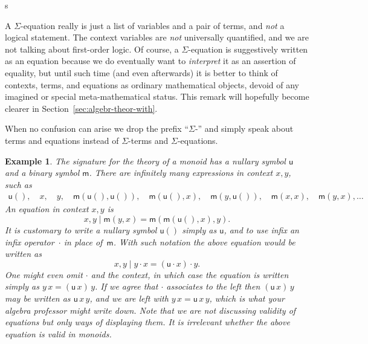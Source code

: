 s\documentclass{amsart}
\newtheorem{example}[definition]{Example}
\begin{document}
A $\Sigma$-equation really is just a list of variables and a pair of terms, and
\emph{not} a logical statement. The context variables are \emph{not} universally
quantified, and we are not talking about first-order logic. Of course, a
$\Sigma$-equation is suggestively written as an equation because we do
eventually want to \emph{interpret} it as an assertion of equality, but until
such time (and even afterwards) it is better to think of contexts, terms, and
equations as ordinary mathematical objects, devoid of any imagined or special
meta-mathematical status. This remark will hopefully become clearer in
Section~\ref{sec:algebr-theor-with}.

When no confusion can arise we drop the prefix ``$\Sigma$-'' and simply speak about
terms and equations instead of $\Sigma$-terms and $\Sigma$-equations.


\begin{example}
  \label{ex:monoid-signature}
  The signature for the theory of a monoid has a nullary symbol $\mathsf{u}$ and a binary
  symbol $\mathsf{m}$. There are infinitely many expressions in context $x, y$, such as
  \begin{align*}
    \mathsf{u}(),\quad
    x,\quad
    y,\quad
    \mathsf{m}(\mathsf{u}(), \mathsf{u}()),\quad
    \mathsf{m}(\mathsf{u}(), x),\quad
    \mathsf{m}(y, \mathsf{u}()),\quad
    \mathsf{m}(x, x),\quad
    \mathsf{m}(y, x),
    \ldots
  \end{align*}
  An equation in context $x, y$ is
  \begin{equation*}
    x, y \mid \mathsf{m}(y, x) = \mathsf{m}(\mathsf{m}(\mathsf{u}(), x), y).
  \end{equation*}
  It is customary to write a nullary symbol $\mathsf{u}()$ simply as $\mathsf{u}$, and to
  use infix an infix operator~$\cdot$ in place of~$\mathsf{m}$. With such notation the
  above equation would be written as
  \begin{equation*}
    x, y \mid y \cdot x = (\mathsf{u} \cdot x) \cdot y.
  \end{equation*}
  One might even omit $\cdot$ and the context, in which case the equation is
  written simply as $y \, x = (\mathsf{u} \, x) \, y$. If we agree that $\cdot$
  associates to the left then $(\mathsf{u} \, x) \, y$ may be written as
  $\mathsf{u} \, x \, y$, and we are left with $y \, x = \mathsf{u} \, x \, y$,
  which is what your algebra professor might write down. Note that we are
  \emph{not} discussing validity of equations but only ways of displaying them.
  It is irrelevant whether the above equation is valid in monoids.
\end{example}
\end{document}
